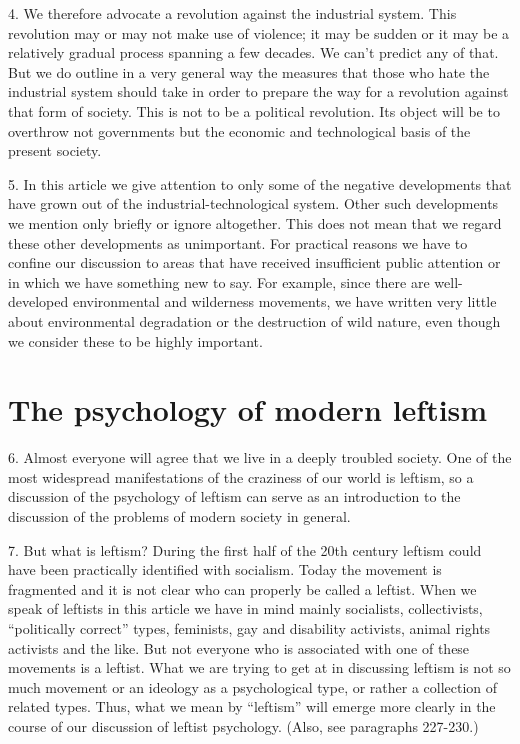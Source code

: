 \documentclass{article}
\begin{document}
4.  We therefore advocate a revolution against the industrial system.  This revolution may or may 
not make use of violence; it may be sudden or it may be a relatively gradual process spanning a 
few decades.  We can’t predict any of that.  But we do outline in a very general way the measures 
that those who hate the industrial system should take in order to prepare the way for a revolution 
against that form of society.  This is not to be a political revolution.  Its object will be to overthrow not governments but the economic and technological basis of the present society. \vspace{\baselineskip}

5.  In this article we give attention to only some of the negative developments that have grown out 
of  the  industrial-technological  system.   Other  such  developments  we  mention  only  briefly  or  
ignore altogether.  This does not mean that we regard these other developments as 
unimportant.  For practical reasons we have to confine our discussion to areas that have received 
insufficient public attention or in which we have something new to say.  For example, since there 
are well-developed environmental and wilderness movements, we have written very little about 
environmental degradation or the destruction of wild nature, even though we consider these to be 
highly important.


\section{The psychology of modern leftism}

\hspace{0.5cm} 6.  Almost  everyone  will  agree  that  we  live  in  a  deeply  troubled  society.   One  of  the  most  
widespread  manifestations  of  the  craziness  of  our  world  is  leftism,  so  a  discussion  of  the  
psychology of leftism can serve as an introduction to the discussion of the problems of modern 
society in general. \vspace{\baselineskip}

7.  But what is leftism? During the first half of the 20th century leftism could have been practically 
identified with socialism.  Today the movement is fragmented and it is not clear who can properly 
be  called  a  leftist.   When  we  speak  of  leftists  in  this  article  we  have  in  mind  mainly  socialists,  
collectivists,  “politically  correct”  types,  feminists,  gay  and  disability  activists,  animal  rights  
activists  and  the  like.   But  not  everyone  who  is  associated  with  one  of  these  movements  is  a  
leftist.  What we are trying to get at in discussing leftism is not so much movement or an ideology 
as a psychological type, or rather a collection of related types.  Thus, what we mean by “leftism” 
will  emerge  more  clearly  in  the  course  of  our  discussion  of  leftist  psychology. (Also,  see  paragraphs 227-230.) \vspace{\baselineskip}
\end{document}
